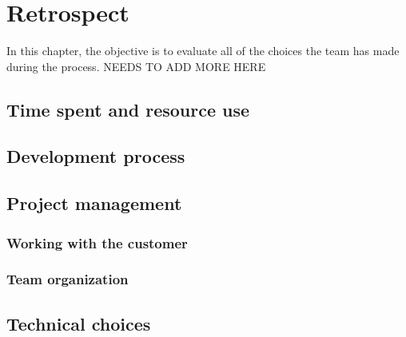 \chapter{Retrospect}
In this chapter, the objective is to evaluate all of the choices the team has made during the process. NEEDS TO ADD MORE HERE

\section{Time spent and resource use}
\section{Development process}
\section{Project management}
\subsection{Working with the customer}
\subsection{Team organization}
\section{Technical choices}